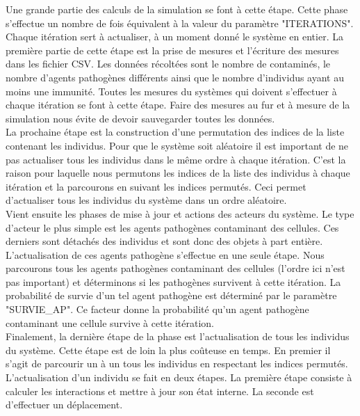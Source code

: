 Une grande partie des calculs de la simulation se font à cette étape. Cette phase s'effectue un nombre de fois équivalent à la valeur du paramètre "ITERATIONS". Chaque itération sert à actualiser, à un moment donné le système en entier. La première partie de cette étape est la prise de mesures et l'écriture des mesures dans les fichier CSV. Les données récoltées sont le nombre de contaminés, le nombre d'agents pathogènes différents ainsi que le nombre d'individus ayant au moins une immunité. Toutes les mesures du systèmes qui doivent s'effectuer à chaque itération se font à cette étape. Faire des mesures au fur et à mesure de la simulation nous évite de devoir sauvegarder toutes les données.\\

La prochaine étape est la construction d'une permutation des indices de la liste contenant les individus. Pour que le système soit aléatoire il est important de ne pas actualiser tous les individus dans le même ordre à chaque itération. C'est la raison pour laquelle nous permutons les indices de la liste des individus à chaque itération et la parcourons en suivant les indices permutés. Ceci permet d'actualiser tous les individus du système dans un ordre aléatoire.\\

Vient ensuite les phases de mise à jour et actions des acteurs du système. Le type d'acteur le plus simple est les agents pathogènes contaminant des cellules. Ces derniers sont détachés des individus et sont donc des objets à part entière. L'actualisation de ces agents pathogène s'effectue en une seule étape. Nous parcourons tous les agents pathogènes contaminant des cellules (l'ordre ici n'est pas important) et déterminons si les pathogènes survivent à cette itération. La probabilité de survie d'un tel agent pathogène est déterminé par le paramètre "SURVIE\_AP". Ce facteur donne la probabilité qu'un agent pathogène contaminant une cellule survive à cette itération.\\

Finalement, la dernière étape de la phase est l'actualisation de tous les individus du système. Cette étape est de loin la plus coûteuse en temps. En premier il s'agit de parcourir un à un tous les individus en respectant les indices permutés. L'actualisation d'un individu se fait en deux étapes. La première étape consiste à calculer les interactions et mettre à jour son état interne. La seconde est d'effectuer un déplacement.\\ 

